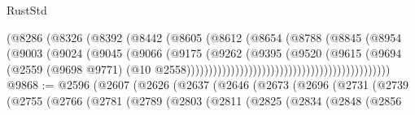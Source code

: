 \begin{lexlean}{RustStd}
\begin{coremodule}
                                                    (@8286
                                                      (@8326
                                                        (@8392
                                                          (@8442
                                                            (@8605
                                                              (@8612
                                                                (@8654
                                                                  (@8788
                                                                    (@8845
                                                                      (@8954
                                                                        (@9003
                                                                          (@9024
                                                                            (@9045
                                                                              (@9066
                                                                                (@9175
                                                                                  (@9262
                                                                                    (@9395
                                                                                      (@9520
                                                                                        (@9615
                                                                                          (@9694
                                                                                            (@2559
                                                                                              (@9698
                                                                                                @9771)
                                                                                              (@10
                                                                                                @2558))))))))))))))))))))))))))))))))))))))))))))))
@9868 := @2596
    (@2607
      (@2626
        (@2637
          (@2646
            (@2673
              (@2696
                (@2731
                  (@2739
                    (@2755
                      (@2766
                        (@2781
                          (@2789
                            (@2803
                              (@2811
                                (@2825
                                  (@2834
                                    (@2848
                                      (@2856

\end{coremodule}
\end{lexlean}
